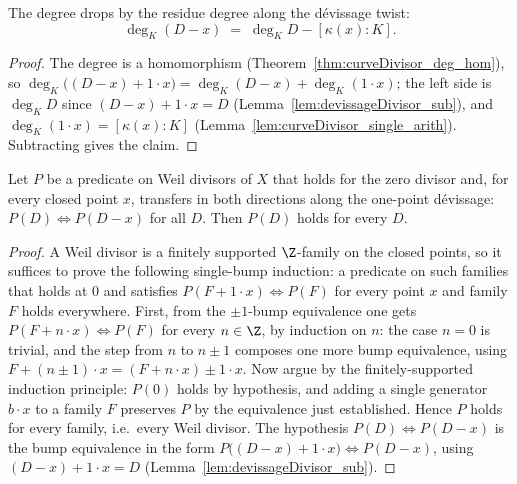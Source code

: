\begin{lemma}
  \label{lem:deg_devissageDivisor}
  \leanok
  The degree drops by the residue degree along the dévissage twist:
  \[
    \deg_K(D - x) \;=\; \deg_K D - [\kappa(x):K].
  \]
\end{lemma}
\begin{proof}
  \leanok
  The degree is a homomorphism (Theorem~\ref{thm:curveDivisor_deg_hom}), so
  \(\deg_K\bigl((D - x) + 1\cdot x\bigr) = \deg_K(D - x) + \deg_K(1 \cdot x)\); the left side is
  \(\deg_K D\) since \((D - x) + 1 \cdot x = D\) (Lemma~\ref{lem:devissageDivisor_sub}), and
  \(\deg_K(1 \cdot x) = [\kappa(x):K]\) (Lemma~\ref{lem:curveDivisor_single_arith}). Subtracting
  gives the claim.
\end{proof}

\begin{theorem}
  \label{thm:induction_devissage}
  \leanok
  Let \(P\) be a predicate on Weil divisors of \(X\) that holds for the zero divisor and, for
  every closed point \(x\), transfers in both directions along the one-point dévissage:
  \(P(D) \iff P(D - x)\) for all \(D\). Then \(P(D)\) holds for every \(D\).
\end{theorem}
\begin{proof}
  \leanok
  A Weil divisor is a finitely supported \(\Z\)-family on the closed points, so it suffices to
  prove the following single-bump induction: a predicate on such families that holds at \(0\) and
  satisfies \(P(F + 1 \cdot x) \iff P(F)\) for every point \(x\) and family \(F\) holds
  everywhere. First, from the \(\pm 1\)-bump equivalence one gets \(P(F + n \cdot x) \iff P(F)\)
  for every \(n \in \Z\), by induction on \(n\): the case \(n = 0\) is trivial, and the step
  from \(n\) to \(n \pm 1\) composes one more bump equivalence, using
  \(F + (n\pm 1)\cdot x = (F + n\cdot x) \pm 1\cdot x\). Now argue by the finitely-supported
  induction principle: \(P(0)\) holds by hypothesis, and adding a single generator \(b \cdot x\)
  to a family \(F\) preserves \(P\) by the equivalence just established. Hence \(P\) holds for
  every family, i.e.\ every Weil divisor. The hypothesis \(P(D) \iff P(D - x)\) is the bump
  equivalence in the form \(P\bigl((D - x) + 1\cdot x\bigr) \iff P(D - x)\), using
  \((D - x) + 1\cdot x = D\) (Lemma~\ref{lem:devissageDivisor_sub}).
\end{proof}

